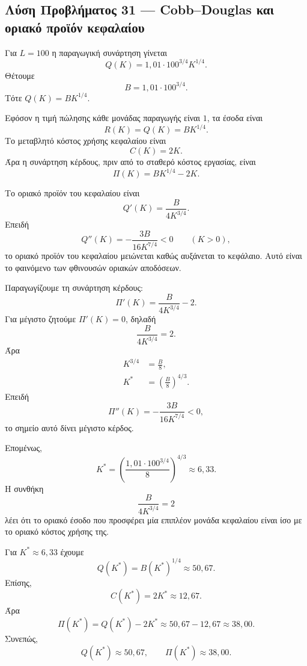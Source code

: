 \subsection*{Λύση Προβλήματος 31 --- Cobb--Douglas και οριακό προϊόν κεφαλαίου}

Για $L=100$ η παραγωγική συνάρτηση γίνεται
\[
  Q(K)=1{,}01\cdot100^{3/4}K^{1/4}.
\]
Θέτουμε
\[
  B=1{,}01\cdot100^{3/4}.
\]
Τότε $Q(K)=BK^{1/4}$.

\begin{alist}
  \item Εφόσον η τιμή πώλησης κάθε μονάδας παραγωγής είναι $1$, τα
        έσοδα είναι
        \[
          R(K)=Q(K)=BK^{1/4}.
        \]
        Το μεταβλητό κόστος χρήσης κεφαλαίου είναι
        \[
          C(K)=2K.
        \]
        Άρα η συνάρτηση κέρδους, πριν από το σταθερό κόστος εργασίας,
        είναι
        \[
          {\Pi(K)=BK^{1/4}-2K}.
        \]

  \item Το οριακό προϊόν του κεφαλαίου είναι
        \[
          Q'(K)=\frac{B}{4K^{3/4}}.
        \]
        Επειδή
        \[
          Q''(K)=-\frac{3B}{16K^{7/4}}<0
          \qquad (K>0),
        \]
        το οριακό προϊόν του κεφαλαίου μειώνεται καθώς αυξάνεται το
        κεφάλαιο. Αυτό είναι το φαινόμενο των φθινουσών οριακών
        αποδόσεων.

  \item Παραγωγίζουμε τη συνάρτηση κέρδους:
        \[
          \Pi'(K)=\frac{B}{4K^{3/4}}-2.
        \]
        Για μέγιστο ζητούμε $\Pi'(K)=0$, δηλαδή
        \[
          \frac{B}{4K^{3/4}}=2.
        \]
        Άρα
        \begin{align*}
          K^{3/4}&=\frac{B}{8},\\
          K^*&=\left(\frac{B}{8}\right)^{4/3}.
        \end{align*}
        Επειδή
        \[
          \Pi''(K)=-\frac{3B}{16K^{7/4}}<0,
        \]
        το σημείο αυτό δίνει μέγιστο κέρδος.

        Επομένως,
        \[
          {
            K^*=
            \left(
              \frac{1{,}01\cdot100^{3/4}}{8}
            \right)^{4/3}
            \approx6{,}33
          }.
        \]
        Η συνθήκη
        \[
          \frac{B}{4K^{3/4}}=2
        \]
        λέει ότι το οριακό έσοδο που προσφέρει μία επιπλέον μονάδα
        κεφαλαίου είναι ίσο με το οριακό κόστος χρήσης της.

  \item Για $K^*\approx6{,}33$ έχουμε
        \[
          Q(K^*)=B(K^*)^{1/4}\approx50{,}67.
        \]
        Επίσης,
        \[
          C(K^*)=2K^*\approx12{,}67.
        \]
        Άρα
        \[
          \Pi(K^*)=Q(K^*)-2K^*
          \approx50{,}67-12{,}67
          \approx38{,}00.
        \]
        Συνεπώς,
        \[
          {Q(K^*)\approx50{,}67},
          \qquad
          {\Pi(K^*)\approx38{,}00}.
        \]
\end{alist}
